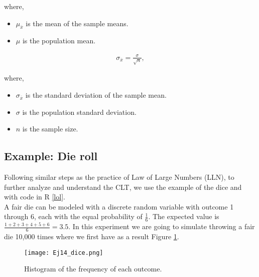 \documentclass{article}
\begin{document}
where,
\begin{itemize}
\item $\mu_{\overline{x}}$ is the mean of the sample means.
\item $\mu$ is the population mean.
\end{itemize}

\begin{eqnarray}
\label{eq2}
\sigma_{\overline{x}} = \frac{\sigma}{\sqrt{n}},
\end{eqnarray}

where,
\begin{itemize}
\item $\sigma_{\overline{x}}$ is the standard deviation of the sample mean.
\item $\sigma$ is the population standard deviation.
\item $n$ is the sample size.
\end{itemize}

\subsection{Example: Die roll}
 Following similar steps as the practice of Law of Large Numbers (LLN), to further analyze and understand the CLT, we use the example of the dice and with code in R \ref{lol}. \\
 
  A fair die can be modeled with a discrete random variable with outcome 1 through 6, each with the equal probability of $\frac{1}{6}$. The expected value is $\frac{1+2+3+4+5+6}{6} =3.5$. In this experiment we are going to simulate throwing a fair die 10,000 times where we first have as a result Figure \ref{fig1}. \\

\begin{figure}[]
\centering
  \texttt{[image: Ej14\_dice.png]} 
   \caption{Histogram of the frequency of each outcome.} 
\label{fig1}
\end{figure}
\end{document}
